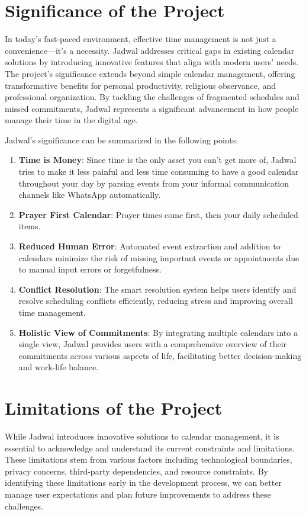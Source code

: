 \documentclass[12pt,a4paper,twoside]{report}
\begin{document}
\section{Significance of the Project}

In today's fast-paced environment, effective time management is not just a convenience—it's a necessity. Jadwal addresses critical gaps in existing calendar solutions by introducing innovative features that align with modern users' needs. The project's significance extends beyond simple calendar management, offering transformative benefits for personal productivity, religious observance, and professional organization. By tackling the challenges of fragmented schedules and missed commitments, Jadwal represents a significant advancement in how people manage their time in the digital age.

Jadwal's significance can be summarized in the following points:
\begin{enumerate}
    \item \textbf{Time is Money}: Since time is the only asset you can't get more of, Jadwal tries to make it less painful and less time consuming to have a good calendar throughout your day by parsing events from your informal communication channels like WhatsApp automatically.
    \item \textbf{Prayer First Calendar}: Prayer times come first, then your daily scheduled items.
    \item \textbf{Reduced Human Error}: Automated event extraction and addition to calendars minimize the risk of missing important events or appointments due to manual input errors or forgetfulness.
    \item \textbf{Conflict Resolution}: The smart resolution system helps users identify and resolve scheduling conflicts efficiently, reducing stress and improving overall time management.
    \item \textbf{Holistic View of Commitments}: By integrating multiple calendars into a single view, Jadwal provides users with a comprehensive overview of their commitments across various aspects of life, facilitating better decision-making and work-life balance.
\end{enumerate}

\section{Limitations of the Project}

While Jadwal introduces innovative solutions to calendar management, it is essential to acknowledge and understand its current constraints and limitations. These limitations stem from various factors including technological boundaries, privacy concerns, third-party dependencies, and resource constraints. By identifying these limitations early in the development process, we can better manage user expectations and plan future improvements to address these challenges.
\end{document}
